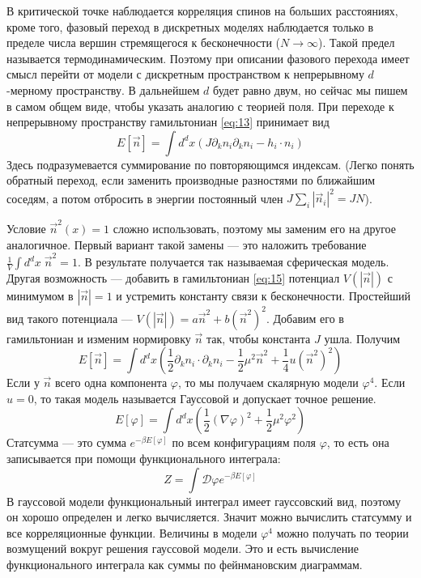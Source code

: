 \documentclass[a4paper,12pt]{article}
\theoremstyle{definition}
\theoremstyle{definition}
\theoremstyle{definition}
\begin{document}
В критической точке наблюдается корреляция спинов на больших расстояниях, кроме того, фазовый переход
в дискретных моделях наблюдается только в пределе числа вершин стремящегося к бесконечности ($N\to
\infty$). Такой предел называется термодинамическим. Поэтому при описании фазового перехода имеет
смысл перейти от модели с дискретным пространством к непрерывному $d$-мерному пространству. В
дальнейшем $d$ будет равно двум, но сейчас мы пишем в самом общем виде, чтобы указать аналогию с
теорией поля. При переходе к непрерывному пространству гамильтониан \eqref{eq:13} принимает вид
\begin{equation}
  \label{eq:15}
  E[\vec n]=\int d^d x \left(J\partial_kn_i\partial_k  n_i-h_i\cdot n_i\right)
\end{equation}
Здесь подразумевается суммирование по повторяющимся индексам. (Легко понять обратный переход, если
заменить производные разностями по ближайшим соседям, а потом отбросить в энергии постоянный член
$J\sum_i \left|\vec n_i\right|^2=JN$).

Условие $\vec n^2(x)=1$ сложно использовать, поэтому мы заменим его на другое аналогичное. Первый
вариант такой замены --- это наложить требование $\frac{1}{V}\int d^dx\; \vec n^2=1$. В результате
получается так называемая сферическая модель. Другая возможность --- добавить в гамильтониан
\eqref{eq:15} потенциал $V(\left|\vec n\right|)$ с минимумом в $\left|\vec n\right|=1$ и устремить
константу связи к бесконечности. Простейший вид такого потенциала --- $V(\left|\vec n\right|)=a\vec
n^2+b\left(\vec n^2\right)^2$. Добавим его в гамильтониан и изменим нормировку $\vec n$ так, чтобы
константа $J$ ушла. Получим
\begin{equation}
  \label{eq:16}
  E[\vec n]=\int d^d x \left(\frac{1}{2}\partial_k n_i\cdot \partial_k n_i-\frac{1}{2}\mu^2 \vec n^2+\frac{1}{4}u\left(\vec n^2\right)^2\right)
\end{equation}
Если у $\vec n$ всего одна компонента $\varphi$, то мы получаем скалярную модели $\varphi^4$. Если
$u=0$, то такая модель называется Гауссовой и допускает точное решение. 
\begin{equation}
  \label{eq:17}
  E[\varphi]=\int d^d x (\frac{1}{2}(\nabla \varphi)^2+\frac{1}{2}\mu^2 \varphi^2)
\end{equation}
Статсумма --- это сумма $e^{-\beta E[\varphi]}$ по всем конфигурациям поля $\varphi$, то есть она
записывается при помощи функционального интеграла: 
\begin{equation}
  \label{eq:18}
  Z=\int \mathcal{D}\varphi e^{-\beta E[\varphi]}
\end{equation}
В гауссовой модели функциональный интеграл имеет гауссовский вид, поэтому он хорошо определен и
легко вычисляется. Значит можно вычислить статсумму и все корреляционные функции. Величины в модели
$\varphi^4$ можно получать по теории возмущений вокруг решения гауссовой модели. Это и есть
вычисление функционального интеграла как суммы по фейнмановским диаграммам.  
\end{document}

